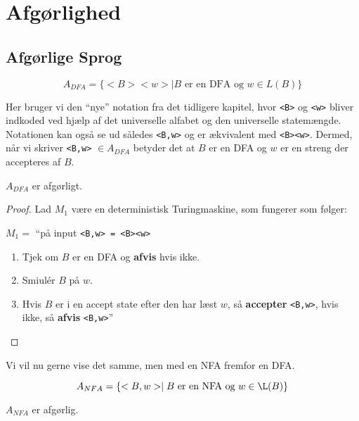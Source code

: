 \chapter{Afgørlighed}

\section{Afgørlige Sprog}%
\label{sec:decideablelanguages}

\begin{equation*}
	A_{DFA} = \{<B><w> \mid B \text{ er en DFA og } w \in L(B) \}
\end{equation*}

Her bruger vi den ``nye'' notation fra det tidligere kapitel, hvor \texttt{<B>} og \texttt{<w>} bliver indkoded ved hjælp af det universelle alfabet og den universelle statemængde. Notationen kan også se ud således \texttt{<B,w>} og er ækvivalent med \texttt{<B><w>}. Dermed, når vi skriver \texttt{<B,w>} $\in A_{DFA}$ betyder det at $B$ er en DFA og $w$ er en streng der accepteres af $B$.

\begin{theorem}
	\label{teo:dfadecidable}
	$A_{DFA}$ er afgørligt.
\end{theorem}

\begin{proof}
	Lad $M_{1}$ være en deterministisk Turingmaskine, som fungerer som følger:

	$M_{1} = $ ``på input \texttt{<B,w> = <B><w>}
	\begin{enumerate}
		\item Tjek om $B$ er en DFA og \textbf{afvis} hvis ikke.
		\item Smiulér $B$ på $w$.
		\item Hvis $B$ er i en accept state efter den har læst $w$, så \textbf{accepter} \texttt{<B,w>}, hvis ikke, så \textbf{afvis} \texttt{<B,w>}''
	\end{enumerate}
\end{proof}

Vi vil nu gerne vise det samme, men med en NFA fremfor en DFA.

\begin{equation*}
	A_{NFA} = \{<B,w> \mid B \text{ er en NFA og }w \in \L(B)\}
\end{equation*}

\begin{theorem}
	$A_{NFA}$ er afgørlig.
\end{theorem}

